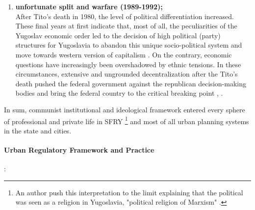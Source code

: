 \documentclass[11pt]{report}
\begin{document}
\begin{enumerate}
\item \textbf{unfortunate split and warfare (1989-1992);}
\\
After Tito's death in 1980, the level of political differentiation increased.
These final years at first indicate that, most of all, the peculiarities of the Yugoslav economic order led to the decision of high political (party) structures for Yugoslavia to abandon this unique socio-political system and  move towards western version of capitalism \href{ref}{\citealt{estrin_yugoslavia:_1991}}.
On the contrary, economic  questions  have  increasingly  been  overshadowed by  ethnic  tensions.
In these circumstances, extensive and ungrounded decentralization after the Tito's death pushed the federal government against the republican decision-making bodies and bring the federal country to the critical breaking point \href{ref}{\citealt{estrin_yugoslavia:_1991}}, \href{ref}{\citealt{vujosevic_post-socialist_2012}}.
\end{enumerate}

In sum, communist institutional and ideological framework entered every sphere of professional and private life in SFRY
\footnote{An author push this interpretation to the limit explaining that the political was seen as a religion in Yugoslavia, "political religion of Marxism" \href{ref}{\citealt{doytchinov_belgrade_2015}}.} and most of all urban planning systems in the state and cities. 

\paragraph{Urban Regulatory Framework and Practice}:
\end{document}
